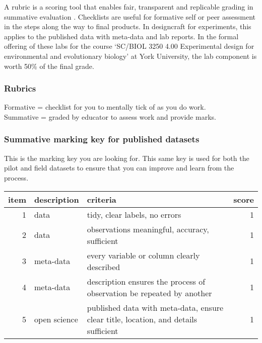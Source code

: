 \documentclass[
]{book}
\begin{document}
A rubric is a scoring tool that enables fair, transparent and replicable grading in summative evaluation \citep{RN6799}. Checklists are useful for formative self or peer assessment in the steps along the way to final products. In designcraft for experiments, this applies to the published data with meta-data and lab reports. In the formal offering of these labs for the course `SC/BIOL 3250 4.00 Experimental design for environmental and evolutionary biology' at York University, the lab component is worth 50\% of the final grade.

\hypertarget{rubrics-1}{%
\subsubsection*{Rubrics}\label{rubrics-1}}

Formative = checklist for you to mentally tick of as you do work.\\
Summative = graded by educator to assess work and provide marks.

\hypertarget{summative-marking-key-for-published-datasets}{%
\subsubsection*{Summative marking key for published datasets}\label{summative-marking-key-for-published-datasets}}

This is the marking key you are looking for. This same key is used for both the pilot and field datasets to ensure that you can improve and learn from the process.

\begin{tabular}{rllr}
\toprule
item & description & criteria & score\\
\midrule
1 & data & tidy, clear labels, no errors & 1\\
2 & data & observations meaningful, accuracy, sufficient & 1\\
3 & meta-data & every variable or column clearly described & 1\\
4 & meta-data & description ensures the process of observation be repeated by another & 1\\
5 & open science & published data with meta-data, ensure clear title, location, and details sufficient & 1\\
\bottomrule
\end{tabular}
\end{document}
